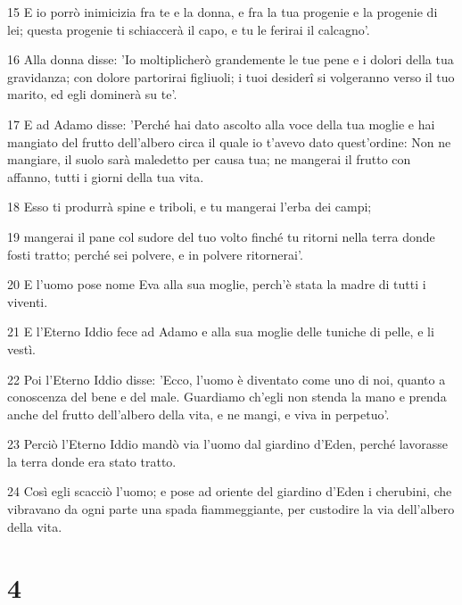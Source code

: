 \par 15 E io porrò inimicizia fra te e la donna, e fra la tua progenie e la progenie di lei; questa progenie ti schiaccerà il capo, e tu le ferirai il calcagno'.
\par 16 Alla donna disse: 'Io moltiplicherò grandemente le tue pene e i dolori della tua gravidanza; con dolore partorirai figliuoli; i tuoi desiderî si volgeranno verso il tuo marito, ed egli dominerà su te'.
\par 17 E ad Adamo disse: 'Perché hai dato ascolto alla voce della tua moglie e hai mangiato del frutto dell'albero circa il quale io t'avevo dato quest'ordine: Non ne mangiare, il suolo sarà maledetto per causa tua; ne mangerai il frutto con affanno, tutti i giorni della tua vita.
\par 18 Esso ti produrrà spine e triboli, e tu mangerai l'erba dei campi;
\par 19 mangerai il pane col sudore del tuo volto finché tu ritorni nella terra donde fosti tratto; perché sei polvere, e in polvere ritornerai'.
\par 20 E l'uomo pose nome Eva alla sua moglie, perch'è stata la madre di tutti i viventi.
\par 21 E l'Eterno Iddio fece ad Adamo e alla sua moglie delle tuniche di pelle, e li vestì.
\par 22 Poi l'Eterno Iddio disse: 'Ecco, l'uomo è diventato come uno di noi, quanto a conoscenza del bene e del male. Guardiamo ch'egli non stenda la mano e prenda anche del frutto dell'albero della vita, e ne mangi, e viva in perpetuo'.
\par 23 Perciò l'Eterno Iddio mandò via l'uomo dal giardino d'Eden, perché lavorasse la terra donde era stato tratto.
\par 24 Così egli scacciò l'uomo; e pose ad oriente del giardino d'Eden i cherubini, che vibravano da ogni parte una spada fiammeggiante, per custodire la via dell'albero della vita.

\chapter{4}

